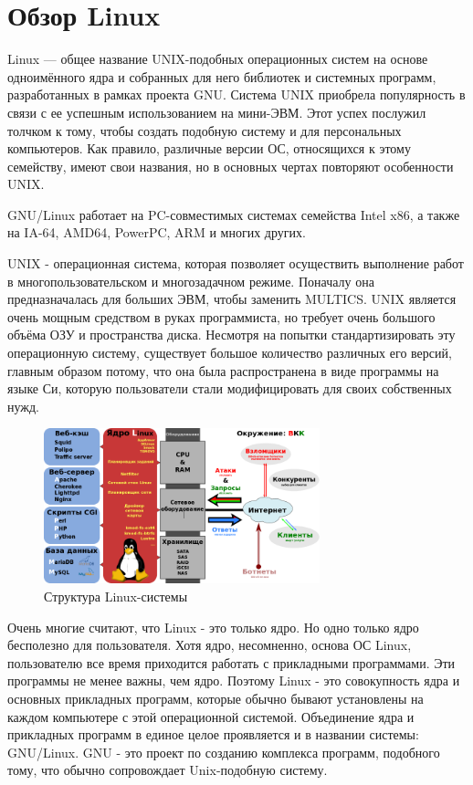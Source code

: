 \section{Обзор Linux}
Linux — общее название UNIX-подобных операционных систем на основе одноимённого ядра и собранных для него библиотек и системных программ, разработанных в рамках проекта GNU.
Система UNIX приобрела популярность в связи с ее успешным использованием на мини-ЭВМ. Этот успех послужил толчком к тому, чтобы создать подобную систему и для персональных компьютеров. Как правило, различные версии ОС, относящихся к этому семейству, имеют свои названия, но в основных чертах повторяют особенности UNIX.

GNU/Linux работает на PC-совместимых системах семейства Intel x86, а также на IA-64, AMD64, PowerPC, ARM и многих других.

UNIX - операционная система, которая позволяет осуществить выполнение работ в многопользовательском и многозадачном режиме. Поначалу она предназначалась для больших ЭВМ, чтобы заменить MULTICS. UNIX является очень мощным средством в руках программиста, но требует очень большого объёма ОЗУ и пространства диска. Несмотря на попытки стандартизировать эту операционную систему, существует большое количество различных его версий, главным образом потому, что она была распространена в виде программы на языке Си, которую пользователи стали модифицировать для своих собственных нужд.

\begin{figure}[!h]
	\vspace{0.5cm}
	\begin{center}
	\includegraphics[width=8cm]{figures/LAMP_software_bundle.png}
	\end{center}
	\caption{Структура Linux-системы}
\end{figure}

Очень многие считают, что Linux - это только ядро. Но одно только ядро бесполезно для пользователя. Хотя ядро, несомненно, основа ОС Linux, пользователю все время приходится работать с прикладными программами. Эти программы не менее важны, чем ядро. Поэтому Linux - это совокупность ядра и основных прикладных программ, которые обычно бывают установлены на каждом компьютере с этой операционной системой. Объединение ядра и прикладных программ в единое целое проявляется и в названии системы: GNU/Linux. GNU - это проект по созданию комплекса программ, подобного тому, что обычно сопровождает Unix-подобную систему.

